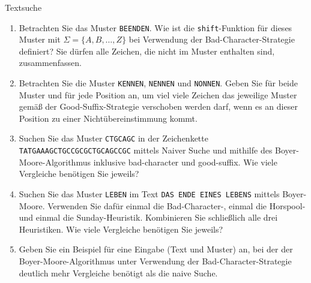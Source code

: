 \documentclass[11pt,a4paper]{article}
\begin{document}
\begin{aufgabe}{3}{Textsuche}
    \begin{enumerate}[label=\alph*)]
        \item Betrachten Sie das Muster \texttt{BEENDEN}.
        Wie ist die \texttt{shift}-Funktion für dieses Muster mit $\Sigma = \{A, B, \ldots, Z\}$ bei Verwendung der Bad-Character-Strategie definiert?
        Sie dürfen alle Zeichen, die nicht im Muster enthalten sind, zusammenfassen.
        \item Betrachten Sie die Muster \texttt{KENNEN}, \texttt{NENNEN} und \texttt{NONNEN}.
        Geben Sie für beide Muster und für jede Position an, um viel viele Zeichen das jeweilige Muster gemäß der Good-Suffix-Strategie verschoben werden darf, wenn es an dieser Position zu einer Nichtübereinstimmung kommt.
        \item Suchen Sie das Muster \texttt{CTGCAGC} in der Zeichenkette \texttt{TATGAAAGCTGCCGCGCTGCAGCCGC} mittels Naiver Suche und mithilfe des Boyer-Moore-Algorithmus inklusive bad-character und good-suffix.
        Wie viele Vergleiche benötigen Sie jeweils?
        \item 
        Suchen Sie das Muster \texttt{LEBEN} im Text \texttt{DAS ENDE EINES LEBENS} mittels Boyer-Moore.
        Verwenden Sie dafür einmal die Bad-Character-, einmal die Horspool- und einmal die Sunday-Heuristik.
        Kombinieren Sie schließlich alle drei Heuristiken.
        Wie viele Vergleiche benötigen Sie jeweils?
        \item Geben Sie ein Beispiel für eine Eingabe (Text und Muster) an, bei der der Boyer-Moore-Algorithmus unter Verwendung der Bad-Character-Strategie deutlich mehr Vergleiche benötigt als die naive Suche.

\end{enumerate}
\end{aufgabe}
\end{document}
